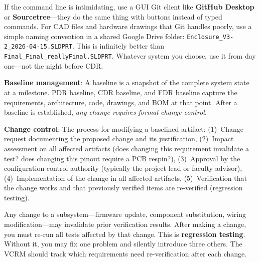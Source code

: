 \documentclass[11pt,letterpaper,twoside,openany]{book}
\begin{document}
\begin{tipbox}
If the command line is intimidating, use a GUI Git client like \textbf{GitHub Desktop} or \textbf{Sourcetree}---they do the same thing with buttons instead of typed commands. For CAD files and hardware drawings that Git handles poorly, use a simple naming convention in a shared Google Drive folder: \texttt{Enclosure\_V3-2\_2026-04-15.SLDPRT}. This is infinitely better than \texttt{Final\_Final\_reallyFinal.SLDPRT}. Whatever system you choose, use it from day one---not the night before CDR.
\end{tipbox}

\textbf{Baseline management}: A baseline is a snapshot of the complete system state at a milestone. PDR baseline, CDR baseline, and FDR baseline capture the requirements, architecture, code, drawings, and BOM at that point. After a baseline is established, \emph{any change requires formal change control}.

\textbf{Change control}: The process for modifying a baselined artifact: (1)~Change request documenting the proposed change and its justification, (2)~Impact assessment on all affected artifacts (does changing this requirement invalidate a test? does changing this pinout require a PCB respin?), (3)~Approval by the configuration control authority (typically the project lead or faculty advisor), (4)~Implementation of the change in all affected artifacts, (5)~Verification that the change works and that previously verified items are re-verified (regression testing).

\begin{warningbox}
Any change to a subsystem---firmware update, component substitution, wiring modification---may invalidate prior verification results. After making a change, you must re-run all tests affected by that change. This is \textbf{regression testing}. Without it, you may fix one problem and silently introduce three others. The VCRM should track which requirements need re-verification after each change.
\end{warningbox}
\end{document}
